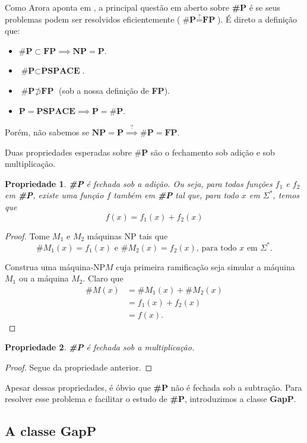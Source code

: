 \documentclass[paper=a4, fontsize=11pt]{scrartcl} %
\newtheorem{property}{Propriedade}
\numberwithin{equation}{subsection}
\numberwithin{figure}{subsection}
\numberwithin{table}{subsection}
\numberwithin{definition}{subsection}
\numberwithin{theorem}{subsection}
\numberwithin{property}{subsection}
\numberwithin{proposition}{subsection}
\newcommand{\words}{$\Sigma^*$\xspace}
\renewcommand{\P}{\textbf{P}\xspace}
\newcommand{\SP}{\textbf{\#P}\xspace}
\newcommand{\NP}{\textbf{NP}\xspace}
\newcommand{\FP}{\textbf{FP}\xspace}
\newcommand{\gP}{\textbf{GapP}\xspace}
\newcommand{\PSPACE}{\textbf{PSPACE}\xspace}
\newcommand{\npmach}{máquina-NP\xspace}
\begin{document}
Como Arora aponta em \cite{Arora09}, a principal questão em aberto sobre \SP é se seus problemas podem ser resolvidos eficientemente ($ \SP \stackrel{?}{=} \FP $). É direto a definição que:
\begin{itemize}
  \item $ \SP \subset \FP \implies \NP = \P $.
  \item $ \SP \subset \PSPACE $.
  \item $ \SP \not\supset \FP $ (sob a nossa definição de \FP).
  \item $ \P = \PSPACE \implies \P = \SP $.
\end{itemize}

Porém, não sabemos se $\NP = \P \stackrel{?}{\implies} \SP = \FP$.

Duas propriedades esperadas sobre $\SP$ são o fechamento sob adição e sob multiplicação.
\begin{property}
\SP é fechada sob a adição. Ou seja, para todas funções $f_1$ e $f_2$ em \SP, existe uma função $f$ também em \SP tal que, para todo $x$ em \words, temos que
\[
f(x) = f_1(x) + f_2(x)
\]
\end{property}
\begin{proof}
Tome $M_1$ e $M_2$ máquinas NP tais que
$$
\#M_1(x) = f_1(x) \text{ e } \#M_2(x) = f_2(x)\text{, para todo $x$ em \words.} 
$$

Construa uma \npmach $M$ cuja primeira ramificação seja simular a máquina $M_1$ ou a máquina $M_2$. Claro que 
\begin{align*}
\#M(x) & = \#M_1(x) + \#M_2(x) \\
       & = f_1(x) + f_2(x)     \\
       & = f(x).
\end{align*}
\end{proof}

\begin{property}
\SP é fechada sob a multiplicação.
\end{property}
\begin{proof}
Segue da propriedade anterior.
\end{proof}

Apesar dessas propriedades, é óbvio que \SP não é fechada sob a subtração. Para resolver esse problema e facilitar o estudo de \SP, introduzimos a classe \gP.

\subsection{A classe \gP}
\end{document}
